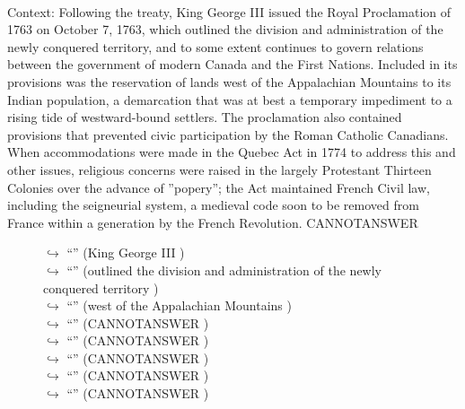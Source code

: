 \documentclass[11pt,a4paper, onecolumn]{article}
\begin{document}
\\ Context: Following the treaty, King George III issued the Royal Proclamation of 1763 on October 7, 1763, which outlined the division and administration of the newly conquered territory, and to some extent continues to govern relations between the government of modern Canada and the First Nations. Included in its provisions was the reservation of lands west of the Appalachian Mountains to its Indian population, a demarcation that was at best a temporary impediment to a rising tide of westward-bound settlers. The proclamation also contained provisions that prevented civic participation by the Roman Catholic Canadians. When accommodations were made in the Quebec Act in 1774 to address this and other issues, religious concerns were raised in the largely Protestant Thirteen Colonies over the advance of ''popery''; the Act maintained French Civil law, including the seigneurial system, a medieval code soon to be removed from France within a generation by the French Revolution. CANNOTANSWER

\begin{figure}[t] \small \begin{tcolorbox}[boxsep=0pt,left=5pt,right=0pt,top=2pt,colback = yellow!5] \begin{dialogue}
 \small 
\colorbox{pink!25}{$\hookrightarrow$}
{ ``'' (King George III ) }
\\
\colorbox{pink!25}{$\hookrightarrow$}
{ ``'' (outlined the division and administration of the newly conquered territory ) }
\\
\colorbox{pink!25}{$\hookrightarrow$}
{ ``'' (west of the Appalachian Mountains ) }
\\
\colorbox{pink!25}{$\hookrightarrow$}
{ ``'' (CANNOTANSWER ) }
\\
\colorbox{pink!25}{$\hookrightarrow$}
{ ``'' (CANNOTANSWER ) }
\\
\colorbox{pink!25}{$\hookrightarrow$}
{ ``'' (CANNOTANSWER ) }
\\
\colorbox{pink!25}{$\hookrightarrow$}
{ ``'' (CANNOTANSWER ) }
\\
\colorbox{pink!25}{$\hookrightarrow$}
{ ``'' (CANNOTANSWER ) }
\\
 \end{dialogue}\end{tcolorbox}\end{figure}
\end{document}
